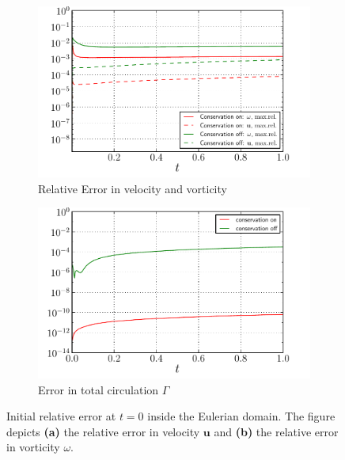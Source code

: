 	\begin{figure}[h]
     \centering
     \begin{subfigure}[t]{0.45\textwidth}
             \includegraphics[width=\linewidth]{./figures/hybrid/lambOseent2/lambOseen_comparision_conservation_compressed.pdf}
             \caption{Relative Error in velocity and vorticity}
             \label{fig:lambOseen_comparision_conservation}
     \end{subfigure}%
     \qquad %
     \begin{subfigure}[t]{0.45\textwidth}
             \includegraphics[width=\linewidth]{./figures/hybrid/lambOseent2/lambOseen_comparision_conservation_circulation_compressed.pdf}
             \caption{Error in total circulation $\Gamma$}
             \label{fig:lambOseen_comparision_conservation_circulation}
     \end{subfigure}%
     \caption{Initial relative error at $t=0$ inside the Eulerian domain. The figure depicts \textbf{(a)} the relative error in velocity $\mathbf{u}$ and \textbf{(b)} the relative error in vorticity $\omega$.}
     \label{fig:lambOseen_conservation_comparisions}
	\end{figure}


